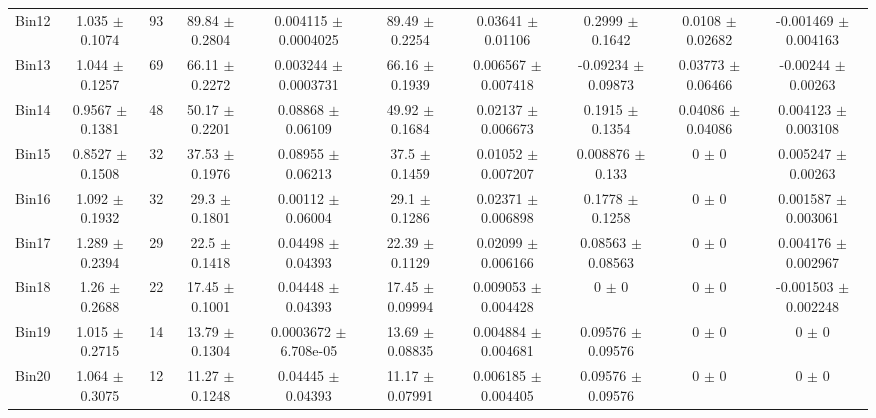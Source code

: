 \begin{tabular}{@{\extracolsep{4pt}}lccccccccc@{}}
     Bin12 & 1.035 $\pm$ 0.1074 & 93 & 89.84 $\pm$ 0.2804 & 0.004115 $\pm$ 0.0004025 & 89.49 $\pm$ 0.2254 & 0.03641 $\pm$ 0.01106 & 0.2999 $\pm$ 0.1642 & 0.0108 $\pm$ 0.02682 & -0.001469 $\pm$ 0.004163 \\ 
     Bin13 & 1.044 $\pm$ 0.1257 & 69 & 66.11 $\pm$ 0.2272 & 0.003244 $\pm$ 0.0003731 & 66.16 $\pm$ 0.1939 & 0.006567 $\pm$ 0.007418 & -0.09234 $\pm$ 0.09873 & 0.03773 $\pm$ 0.06466 & -0.00244 $\pm$ 0.00263 \\ 
     Bin14 & 0.9567 $\pm$ 0.1381 & 48 & 50.17 $\pm$ 0.2201 & 0.08868 $\pm$ 0.06109 & 49.92 $\pm$ 0.1684 & 0.02137 $\pm$ 0.006673 & 0.1915 $\pm$ 0.1354 & 0.04086 $\pm$ 0.04086 & 0.004123 $\pm$ 0.003108 \\ 
     Bin15 & 0.8527 $\pm$ 0.1508 & 32 & 37.53 $\pm$ 0.1976 & 0.08955 $\pm$ 0.06213 & 37.5 $\pm$ 0.1459 & 0.01052 $\pm$ 0.007207 & 0.008876 $\pm$ 0.133 & 0 $\pm$ 0 & 0.005247 $\pm$ 0.00263 \\ 
     Bin16 & 1.092 $\pm$ 0.1932 & 32 & 29.3 $\pm$ 0.1801 & 0.00112 $\pm$ 0.06004 & 29.1 $\pm$ 0.1286 & 0.02371 $\pm$ 0.006898 & 0.1778 $\pm$ 0.1258 & 0 $\pm$ 0 & 0.001587 $\pm$ 0.003061 \\ 
     Bin17 & 1.289 $\pm$ 0.2394 & 29 & 22.5 $\pm$ 0.1418 & 0.04498 $\pm$ 0.04393 & 22.39 $\pm$ 0.1129 & 0.02099 $\pm$ 0.006166 & 0.08563 $\pm$ 0.08563 & 0 $\pm$ 0 & 0.004176 $\pm$ 0.002967 \\ 
     Bin18 & 1.26 $\pm$ 0.2688 & 22 & 17.45 $\pm$ 0.1001 & 0.04448 $\pm$ 0.04393 & 17.45 $\pm$ 0.09994 & 0.009053 $\pm$ 0.004428 & 0 $\pm$ 0 & 0 $\pm$ 0 & -0.001503 $\pm$ 0.002248 \\ 
     Bin19 & 1.015 $\pm$ 0.2715 & 14 & 13.79 $\pm$ 0.1304 & 0.0003672 $\pm$ 6.708e-05 & 13.69 $\pm$ 0.08835 & 0.004884 $\pm$ 0.004681 & 0.09576 $\pm$ 0.09576 & 0 $\pm$ 0 & 0 $\pm$ 0 \\ 
     Bin20 & 1.064 $\pm$ 0.3075 & 12 & 11.27 $\pm$ 0.1248 & 0.04445 $\pm$ 0.04393 & 11.17 $\pm$ 0.07991 & 0.006185 $\pm$ 0.004405 & 0.09576 $\pm$ 0.09576 & 0 $\pm$ 0 & 0 $\pm$ 0 \\ 
\hline\hline
  \end{tabular}
